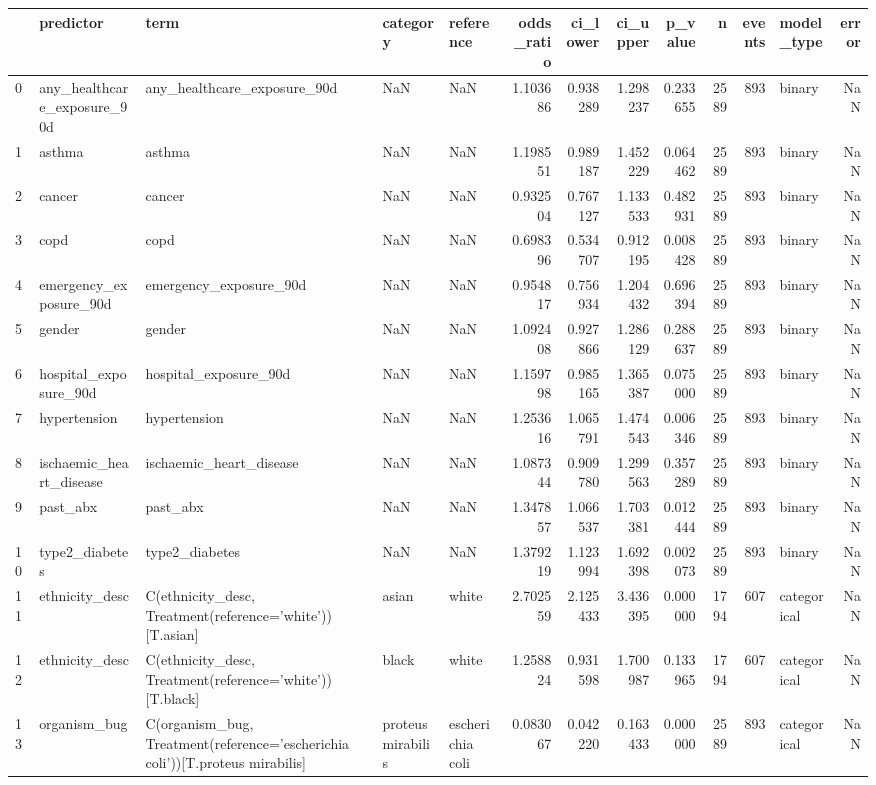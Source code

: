 \begin{tabular}{lllllrrrrrrlr}
\toprule
 & predictor & term & category & reference & odds_ratio & ci_lower & ci_upper & p_value & n & events & model_type & error \\
\midrule
0 & any_healthcare_exposure_90d & any_healthcare_exposure_90d & NaN & NaN & 1.103686 & 0.938289 & 1.298237 & 0.233655 & 2589 & 893 & binary & NaN \\
1 & asthma & asthma & NaN & NaN & 1.198551 & 0.989187 & 1.452229 & 0.064462 & 2589 & 893 & binary & NaN \\
2 & cancer & cancer & NaN & NaN & 0.932504 & 0.767127 & 1.133533 & 0.482931 & 2589 & 893 & binary & NaN \\
3 & copd & copd & NaN & NaN & 0.698396 & 0.534707 & 0.912195 & 0.008428 & 2589 & 893 & binary & NaN \\
4 & emergency_exposure_90d & emergency_exposure_90d & NaN & NaN & 0.954817 & 0.756934 & 1.204432 & 0.696394 & 2589 & 893 & binary & NaN \\
5 & gender & gender & NaN & NaN & 1.092408 & 0.927866 & 1.286129 & 0.288637 & 2589 & 893 & binary & NaN \\
6 & hospital_exposure_90d & hospital_exposure_90d & NaN & NaN & 1.159798 & 0.985165 & 1.365387 & 0.075000 & 2589 & 893 & binary & NaN \\
7 & hypertension & hypertension & NaN & NaN & 1.253616 & 1.065791 & 1.474543 & 0.006346 & 2589 & 893 & binary & NaN \\
8 & ischaemic_heart_disease & ischaemic_heart_disease & NaN & NaN & 1.087344 & 0.909780 & 1.299563 & 0.357289 & 2589 & 893 & binary & NaN \\
9 & past_abx & past_abx & NaN & NaN & 1.347857 & 1.066537 & 1.703381 & 0.012444 & 2589 & 893 & binary & NaN \\
10 & type2_diabetes & type2_diabetes & NaN & NaN & 1.379219 & 1.123994 & 1.692398 & 0.002073 & 2589 & 893 & binary & NaN \\
11 & ethnicity_desc & C(ethnicity_desc, Treatment(reference='white'))[T.asian] & asian & white & 2.702559 & 2.125433 & 3.436395 & 0.000000 & 1794 & 607 & categorical & NaN \\
12 & ethnicity_desc & C(ethnicity_desc, Treatment(reference='white'))[T.black] & black & white & 1.258824 & 0.931598 & 1.700987 & 0.133965 & 1794 & 607 & categorical & NaN \\
13 & organism_bug & C(organism_bug, Treatment(reference='escherichia coli'))[T.proteus mirabilis] & proteus mirabilis & escherichia coli & 0.083067 & 0.042220 & 0.163433 & 0.000000 & 2589 & 893 & categorical & NaN \\

\end{tabular}
